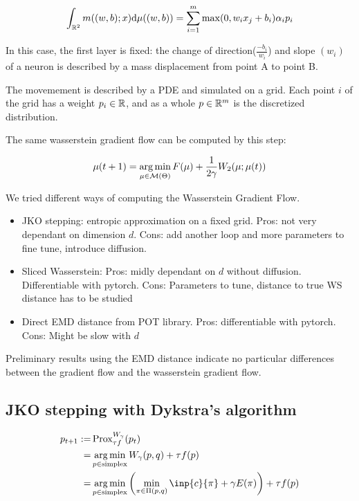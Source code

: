\begin{equation}
	\int_{\mathbb{R}^2} m((w, b); x) \mathrm{d} \mu((w, b)) = \sum_{i=1}^{m} \max(0, w_i x_j + b_i) \alpha_i p_i
\end{equation}

In this case, the first layer is fixed: the change of direction($\frac{-b_i}{w_i}$) and slope $(w_i)$ of a neuron is described by a mass displacement from point A to point B. 

The movemement is described by a PDE and simulated on a grid. Each point $i$ of the grid has a weight $p_i \in \mathbb{R}$, and as a whole $p \in \mathbb{R}^m$ is the discretized distribution.

The same wasserstein gradient flow can be computed by this step:

\begin{equation}
	\mu(t+1) = \operatorname*{arg\,min}_{\mu \in \mathcal{M}(\Theta)} F(\mu) + \frac{1}{2 \gamma} W_2(\mu; \mu(t))
\end{equation}

We tried different ways of computing the Wasserstein Gradient Flow. 

\begin{itemize}
	\item JKO stepping: entropic approximation on a fixed grid. Pros: not very dependant on dimension $d$. Cons: add another loop and more parameters to fine tune, introduce diffusion.
		\item Sliced Wasserstein: Pros: midly dependant on $d$ without diffusion. Differentiable with pytorch. Cons: Parameters to tune, distance to true WS distance has to be studied
		\item Direct EMD distance from POT library. Pros: differentiable with pytorch. Cons: Might be slow with $d$
\end{itemize}

Preliminary results using the EMD distance indicate no particular differences between the gradient flow and the wasserstein gradient flow.

\subsection{JKO stepping with Dykstra's algorithm}

\begin{align}
p_{t+1} := & \prox^{W_{\gamma}}_{\tau f}(p_t) \\
							= & \argmin_{p \in \text{simplex}} W_{\gamma}(p, q) + \tau f(p) \\
							= &\argmin_{p \in \text{simplex}}  \left( \min_{\pi \in \Pi(p, q)} \inp{c}{\pi} + \gamma E(\pi) \right) + \tau f(p)
\end{align}

